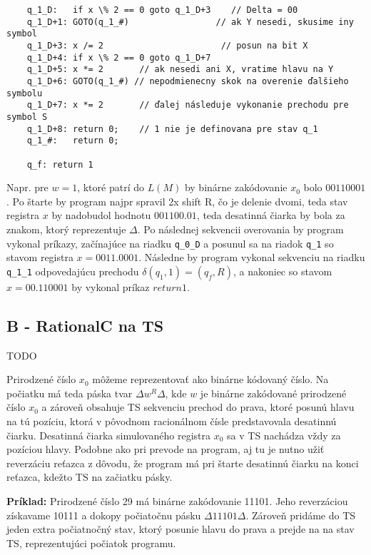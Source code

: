 \documentclass[10pt]{article}
\begin{document}
\begin{verbatim}
    q_1_D:   if x \% 2 == 0 goto q_1_D+3    // Delta = 00
    q_1_D+1: GOTO(q_1_#)                 // ak Y nesedi, skusime iny symbol 
    q_1_D+3: x /= 2                       // posun na bit X
    q_1_D+4: if x \% 2 == 0 goto q_1_D+7 
    q_1_D+5: x *= 2       // ak nesedi ani X, vratime hlavu na Y
    q_1_D+6: GOTO(q_1_#) // nepodmienecny skok na overenie ďalšieho symbolu
    q_1_D+7: x *= 2       // ďalej následuje vykonanie prechodu pre symbol S
    q_1_D+8: return 0;    // 1 nie je definovana pre stav q_1
    q_1_#:   return 0;

    q_f: return 1
    \end{verbatim}
    \normalsize

    Napr. pre $w = 1$, ktoré patrí do $L(M)$ by binárne zakódovanie $x_0$ bolo $00 11 00 01$.
    Po štarte by program najpr spravil 2x shift R, čo je delenie dvomi, teda stav registra $x$
    by nadobudol hodnotu $001100.01$, teda desatinná čiarka by bola za znakom, ktorý reprezentuje
    $\Delta$. Po následnej sekvencii overovania by program vykonal príkazy, začínajúce na riadku
    \texttt{q\_0\_D} a posunul sa na riadok \texttt{q\_1} so stavom registra $x = 00 11.0001$. Následne by program
    vykonal sekvenciu na riadku \texttt{q\_1\_1} odpovedajúcu prechodu $\delta(q_1, 1) = (q_f, R)$,
    a nakoniec so stavom $x = 00.110001$ by vykonal príkaz $return 1$.
    

\subsection*{B - RationalC na TS}
TODO

Prirodzené číslo $x_0$ môžeme reprezentovať ako binárne kódovaný číslo. Na počiatku má teda páska
tvar $\Delta w^R \Delta$, kde $w$ je binárne zakódované prirodzené číslo $x_0$ a zároveň obsahuje TS sekvenciu
prechod do prava, ktoré posunú hlavu na tú pozíciu, ktorá v pôvodnom racionálnom čísle
predstavovala desatinnú čiarku. Desatinná čiarka simulovaného registra $x_0$ sa v TS nachádza vždy
za pozíciou hlavy.
Podobne ako pri prevode na program, aj tu je nutno užiť reverzáciu reťazca z dôvodu, že program má
pri štarte desatinnú čiarku na konci reťazca, kdežto TS na začiatku pásky.

\textbf{Príklad:}
Prirodzené číslo 29 má binárne zakódovanie 11101. Jeho reverzáciou získavame 10111 a dokopy
počiatočnu pásku $\Delta 11101 \Delta$. 
Zároveň pridáme do TS jeden extra počiatnočný stav, ktorý posunie hlavu do prava a prejde na
na stav TS, reprezentujúci počiatok programu.
\end{document}
